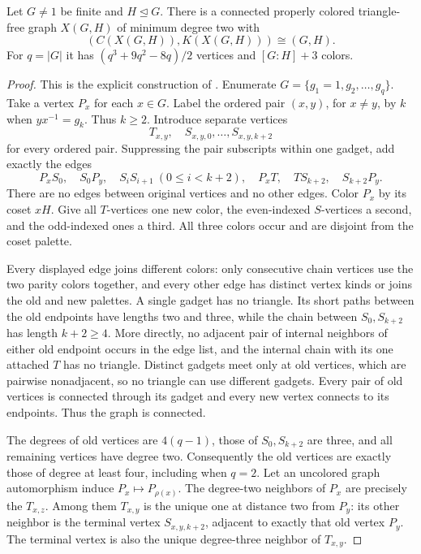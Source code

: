 \begin{theorem}\label{UR.PairEncoding}
Let $G\ne1$ be finite and $H\mathrel{\trianglelefteq}G$. There is a connected
properly colored triangle-free graph $X(G,H)$ of minimum degree two with
\[
 (C(X(G,H)),K(X(G,H)))\cong(G,H).
\]
For $q=|G|$ it has $(q^3+9q^2-8q)/2$ vertices and $[G:H]+3$ colors.
\end{theorem}
\begin{proof}
This is the explicit construction of \cite[Theorem 3.1]{DMV}.
Enumerate $G=\{g_1=1,g_2,\ldots,g_q\}$. Take a vertex $P_x$ for each
$x\in G$. Label the ordered pair $(x,y)$, for $x\ne y$, by $k$ when
$yx^{-1}=g_k$. Thus $k\geq2$. Introduce separate vertices
\[
 T_{x,y},\quad S_{x,y,0},\ldots,S_{x,y,k+2}
\]
for every ordered pair. Suppressing the pair subscripts within one gadget,
add exactly the edges
\begin{equation}\label{eq:arrow}
 P_xS_0,\quad S_0P_y,\quad
 S_iS_{i+1}\ (0\leq i<k+2),\quad
 P_xT,\quad TS_{k+2},\quad S_{k+2}P_y.
\end{equation}
There are no edges between original vertices and no other edges. Color $P_x$
by its coset $xH$. Give all $T$-vertices one new color, the even-indexed
$S$-vertices a second, and the odd-indexed ones a third. All three colors
occur and are disjoint from the coset palette.

Every displayed edge joins different colors: only consecutive chain vertices
use the two parity colors together, and every other edge has distinct vertex
kinds or joins the old and new palettes. A single gadget has no triangle.
Its short paths between the old endpoints have lengths two and three, while
the chain between $S_0,S_{k+2}$ has length $k+2\geq4$. More directly, no
adjacent pair of internal neighbors of either old endpoint occurs in the
edge list, and the internal chain with its one attached $T$ has no triangle.
Distinct gadgets meet only at old vertices, which are pairwise nonadjacent,
so no triangle can use different gadgets. Every pair of old vertices is
connected through its gadget and every new vertex connects to its endpoints.
Thus the graph is connected.

The degrees of old vertices are $4(q-1)$, those of $S_0,S_{k+2}$ are three,
and all remaining vertices have degree two. Consequently the old vertices
are exactly those of degree at least four, including when $q=2$.
Let an uncolored graph automorphism induce $P_x\mapsto P_{\rho(x)}$.
The degree-two neighbors of $P_x$ are precisely the $T_{x,z}$.
Among them $T_{x,y}$ is the unique one at distance two from $P_y$: its other
neighbor is the terminal vertex $S_{x,y,k+2}$, adjacent to exactly that old
vertex $P_y$. The terminal vertex is also the unique degree-three neighbor
of $T_{x,y}$.


\end{proof}
